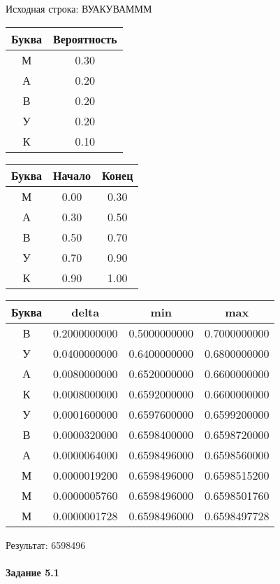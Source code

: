 \documentclass[a4paper, 12pt]{article}
\begin{document}
Исходная строка: ВУАКУВАМММ\
\begin{center}
 \begin{tabular}{ |c|c| } 
  \hline
     Буква & Вероятность \\ \hline
М & 0.30\\\hline
А & 0.20\\\hline
В & 0.20\\\hline
У & 0.20\\\hline
К & 0.10
\\ \hline \end{tabular}
\end{center}
\begin{center}
 \begin{tabular}{ |c|c|c| } 
  \hline
     Буква & Начало & Конец \\ \hline
М & 0.00 & 0.30\\\hline
А & 0.30 & 0.50\\\hline
В & 0.50 & 0.70\\\hline
У & 0.70 & 0.90\\\hline
К & 0.90 & 1.00
\\ \hline \end{tabular}
\end{center}
\begin{center}
 \begin{tabular}{ |c|c|c|c| } 
  \hline
     Буква & delta & min & max \\ \hline
В & 0.2000000000 & 0.5000000000 & 0.7000000000\\\hline
У & 0.0400000000 & 0.6400000000 & 0.6800000000\\\hline
А & 0.0080000000 & 0.6520000000 & 0.6600000000\\\hline
К & 0.0008000000 & 0.6592000000 & 0.6600000000\\\hline
У & 0.0001600000 & 0.6597600000 & 0.6599200000\\\hline
В & 0.0000320000 & 0.6598400000 & 0.6598720000\\\hline
А & 0.0000064000 & 0.6598496000 & 0.6598560000\\\hline
М & 0.0000019200 & 0.6598496000 & 0.6598515200\\\hline
М & 0.0000005760 & 0.6598496000 & 0.6598501760\\\hline
М & 0.0000001728 & 0.6598496000 & 0.6598497728
\\ \hline \end{tabular}
\end{center}
Результат: 6598496
\pagebreak
\paragraph{Задание 5.1 \\
}
\end{document}
